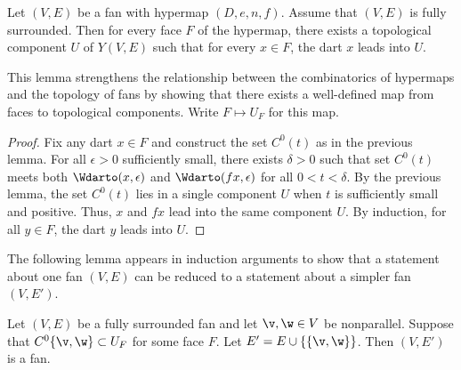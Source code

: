 \begin{lemma} \label{lemma:UF}
Let $(V,E)$ be a fan with hypermap $(D,e,n,f)$.  Assume that $(V,E)$
is fully surrounded.  Then for every face $F$ of the hypermap, there
exists a topological component $U$ of $Y(V,E)$ such that for every
$x\in F$, the dart $x$ leads into $U$.
\end{lemma}
%
%
%

This lemma strengthens the relationship between the
combinatorics of hypermaps and the topology of fans by showing that there exists a
well-defined map from faces to topological components.  Write
$F\mapsto U_F$ for this map.
%

\begin{proof} Fix any dart $x\in F$ and construct the set $C^0(t)$ as
in the previous lemma.  For all $\epsilon>0$ sufficiently small,
there exists $\delta>0$ such that set $C^0(t)$ meets both
$\Wdarto(x,\epsilon)$ and $\Wdarto(f x,\epsilon)$ for all
$0<t<\delta$.  By the previous lemma, the set $C^0(t)$ lies in a
single component $U$ when $t$ is sufficiently small and positive.
Thus, $x$ and $f x$ lead into the same component $U$.  By induction,
for all $y\in F$, the dart $y$ leads into $U$.
\end{proof}
%
%

The following lemma appears in induction arguments to show
that a statement about one fan $(V,E)$ can be reduced to a statement
about a simpler fan $(V,E')$.

\begin{lemma}\cutrate{}\label{lemma:add-edge}
  Let $(V,E)$ be a fully surrounded fan and let $\v,\w\in V$ be
  nonparallel.  Suppose that $C^0\{\v,\w\}\subset U_F$ for some face
  $F$.  Let $E' = E\cup\{\{\v,\w\}\}$.  Then $(V,E')$ is a fan.
\end{lemma}

